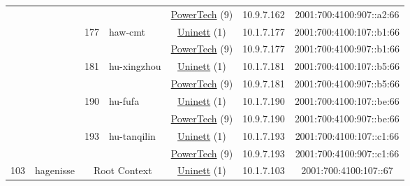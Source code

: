 \begin{small}
\begin{center}
\begin{longtable}{|c|c|c|c|c|c|c|c|}
  &  &  &  & \multicolumn{2}{|c|}{\tiny{\href{http://www.powertech.no}{PowerTech} (9)}} & \tiny{10.9.7.162} & \tiny{2001:700:4100:907::a2:66} \\* \cline{3-3}\cline{4-4}\cline{5-5}\cline{6-6}\cline{7-7}\cline{8-8}
  &  & \multirow{2}{*}{\tiny{177}} & \multicolumn{1}{|l|}{\multirow{2}{*}{\tiny{haw-cmt}}} & \multicolumn{2}{|c|}{\tiny{\href{https://www.uninett.no}{Uninett} (1)}} & \tiny{10.1.7.177} & \tiny{2001:700:4100:107::b1:66} \\* \cline{5-5}\cline{6-6}\cline{7-7}\cline{8-8}
  &  &  &  & \multicolumn{2}{|c|}{\tiny{\href{http://www.powertech.no}{PowerTech} (9)}} & \tiny{10.9.7.177} & \tiny{2001:700:4100:907::b1:66} \\* \cline{3-3}\cline{4-4}\cline{5-5}\cline{6-6}\cline{7-7}\cline{8-8}
  &  & \multirow{2}{*}{\tiny{181}} & \multicolumn{1}{|l|}{\multirow{2}{*}{\tiny{hu-xingzhou}}} & \multicolumn{2}{|c|}{\tiny{\href{https://www.uninett.no}{Uninett} (1)}} & \tiny{10.1.7.181} & \tiny{2001:700:4100:107::b5:66} \\* \cline{5-5}\cline{6-6}\cline{7-7}\cline{8-8}
  &  &  &  & \multicolumn{2}{|c|}{\tiny{\href{http://www.powertech.no}{PowerTech} (9)}} & \tiny{10.9.7.181} & \tiny{2001:700:4100:907::b5:66} \\* \cline{3-3}\cline{4-4}\cline{5-5}\cline{6-6}\cline{7-7}\cline{8-8}
  &  & \multirow{2}{*}{\tiny{190}} & \multicolumn{1}{|l|}{\multirow{2}{*}{\tiny{hu-fufa}}} & \multicolumn{2}{|c|}{\tiny{\href{https://www.uninett.no}{Uninett} (1)}} & \tiny{10.1.7.190} & \tiny{2001:700:4100:107::be:66} \\* \cline{5-5}\cline{6-6}\cline{7-7}\cline{8-8}
  &  &  &  & \multicolumn{2}{|c|}{\tiny{\href{http://www.powertech.no}{PowerTech} (9)}} & \tiny{10.9.7.190} & \tiny{2001:700:4100:907::be:66} \\* \cline{3-3}\cline{4-4}\cline{5-5}\cline{6-6}\cline{7-7}\cline{8-8}
  &  & \multirow{2}{*}{\tiny{193}} & \multicolumn{1}{|l|}{\multirow{2}{*}{\tiny{hu-tanqilin}}} & \multicolumn{2}{|c|}{\tiny{\href{https://www.uninett.no}{Uninett} (1)}} & \tiny{10.1.7.193} & \tiny{2001:700:4100:107::c1:66} \\* \cline{5-5}\cline{6-6}\cline{7-7}\cline{8-8}
  &  &  &  & \multicolumn{2}{|c|}{\tiny{\href{http://www.powertech.no}{PowerTech} (9)}} & \tiny{10.9.7.193} & \tiny{2001:700:4100:907::c1:66} \\ \hline
 \multirow{26}{*}{\tiny{103}} & \multicolumn{1}{|l|}{\multirow{26}{*}{\tiny{hagenisse}}} & \multicolumn{2}{|c|}{\multirow{2}{*}{\tiny{Root Context}}} & \multicolumn{2}{|c|}{\tiny{\href{https://www.uninett.no}{Uninett} (1)}} & \tiny{10.1.7.103} & \tiny{2001:700:4100:107::67} \\* \cline{5-5}\cline{6-6}\cline{7-7}\cline{8-8}

\end{longtable}
\end{center}
\end{small}
